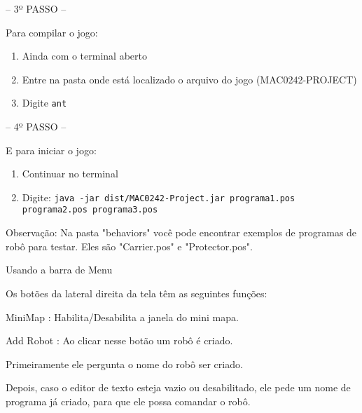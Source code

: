 \documentclass[a4paper]{article}
\begin{document}
{{{\begin{enumerate}
\end{enumerate}

\bigskip


\textcolor{NavyBlue}{-- 3º PASSO --}

Para compilar o jogo:

\begin{enumerate}
    \item Ainda com o terminal aberto

    \item Entre na pasta onde está localizado o arquivo do jogo (MAC0242-PROJECT)

    \item Digite \texttt{ant}
\end{enumerate}

\bigskip



\textcolor{NavyBlue}{-- 4º PASSO --}

E para iniciar o jogo: 

\begin{enumerate}                                            
    \item Continuar no terminal
 	\item Digite: \texttt{java -jar dist/MAC0242-Project.jar
          programa1.pos programa2.pos programa3.pos}
\end{enumerate}

Observação: Na pasta "behaviors" você pode encontrar exemplos de 
programas de robô para testar.
Eles são "Carrier.pos" e "Protector.pos".

\bigskip

\newpage %


{\textcolor{NavyBlue}{\LARGE Usando a barra de Menu}

Os botões da lateral direita da tela têm as seguintes
funções:

\begin{itemize}    
                                        
    \item {\textcolor{NavyBlue}{MiniMap :}
        Habilita/Desabilita a janela do mini mapa.

 	\item {\textcolor{NavyBlue}{Add Robot :}
 	    Ao clicar nesse botão um robô é criado.
 	    
 	    Primeiramente ele pergunta o nome do robô
 	    ser criado.
 	    
 	    Depois, caso o editor de texto esteja vazio
 	    ou desabilitado, ele pede um nome de programa
 	    já criado, para que ele possa comandar o robô.
 	    
}}
\end{itemize}}}}}
\end{document}
